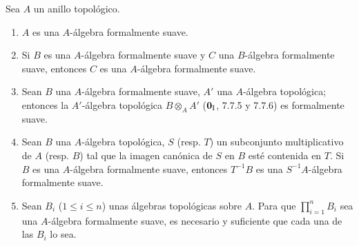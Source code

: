 \begin{proposition}[19.3.5]
\label{0.19.3.5-fr}
Sea $A$ un anillo topológico.
\begin{enumerate}
  \item[\textup{(i)}] $A$ es una $A$-álgebra formalmente suave.
  \item[\textup{(ii)}] Si $B$ es una $A$-álgebra formalmente suave y $C$ una
  $B$-álgebra formalmente suave, entonces $C$ es una $A$-álgebra formalmente
  suave.
  \item[\textup{(iii)}] Sean $B$ una $A$-álgebra formalmente suave, $A'$ una
  $A$-álgebra topológica; entonces la $A'$-álgebra topológica
  $B\otimes_A A'$ \textup{($\mathbf 0_{\rm I}$, 7.7.5 y 7.7.6)} es formalmente
  suave.
  \item[\textup{(iv)}] Sean $B$ una $A$-álgebra topológica, $S$ \textup{(resp. $T$)} un
  subconjunto multiplicativo de $A$ \textup{(resp. $B$)} tal que la imagen canónica de $S$
  en $B$ esté contenida en $T$. Si $B$ es una $A$-álgebra formalmente
  suave, entonces $T^{-1}B$ es una $S^{-1}A$-álgebra formalmente suave.
  \item[\textup{(v)}] Sean $B_i$ \textup{($1\leq i\leq n$)} unas álgebras topológicas sobre $A$.
  Para que $\prod_{i=1}^n B_i$ sea una $A$-álgebra formalmente suave, es
  necesario y suficiente que cada una de las $B_i$ lo sea.
\end{enumerate}
\end{proposition}



